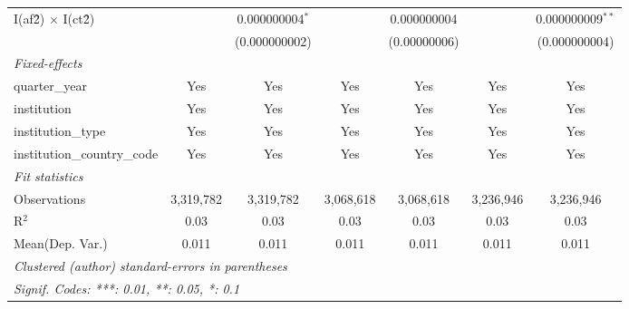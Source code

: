 \begin{tabular}{lcccccc}
   I(af\^2) $\times$ I(ct\^2)         &                & 0.000000004$^{*}$ &                & 0.000000004     &                & 0.000000009$^{**}$\\   
                                      &                & (0.000000002)     &                & (0.00000006)    &                & (0.000000004)\\   
   \midrule
   \emph{Fixed-effects}\\
   quarter\_year                      & Yes            & Yes               & Yes            & Yes             & Yes            & Yes\\  
   institution                        & Yes            & Yes               & Yes            & Yes             & Yes            & Yes\\  
   institution\_type                  & Yes            & Yes               & Yes            & Yes             & Yes            & Yes\\  
   institution\_country\_code         & Yes            & Yes               & Yes            & Yes             & Yes            & Yes\\  
   \midrule
   \emph{Fit statistics}\\
   Observations                       & 3,319,782      & 3,319,782         & 3,068,618      & 3,068,618       & 3,236,946      & 3,236,946\\  
   R$^2$                              & 0.03           & 0.03              & 0.03           & 0.03            & 0.03           & 0.03\\  
Mean(Dep. Var.) & 0.011 & 0.011 & 0.011 & 0.011 & 0.011 & 0.011 \\
   \midrule \midrule
   \multicolumn{7}{l}{\emph{Clustered (author) standard-errors in parentheses}}\\
   \multicolumn{7}{l}{\emph{Signif. Codes: ***: 0.01, **: 0.05, *: 0.1}}\\
\end{tabular}
\par\endgroup
